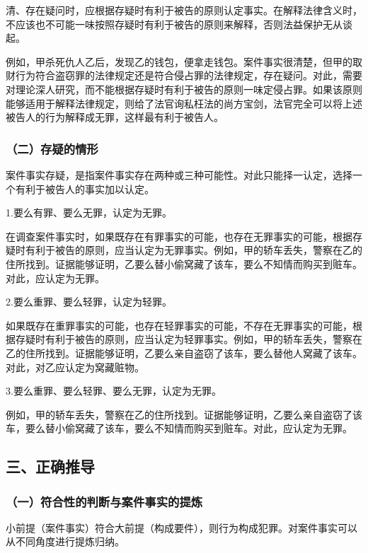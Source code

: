 清、存在疑问时，应根据存疑时有利于被告的原则认定事实。在解释法律含义时，不应该也不可能一味按照存疑时有利于被告的原则来解释，否则法益保护无从谈起。

例如，甲杀死仇人乙后，发现乙的钱包，便拿走钱包。案件事实很清楚，但甲的取财行为符合盗窃罪的法律规定还是符合侵占罪的法律规定，存在疑问。对此，需要对理论深人研究，而不能根据存疑时有利于被告的原则一味定侵占罪。如果该原则能够适用于解释法律规定，则给了法官询私枉法的尚方宝剑，法官完全可以将上述被告人的行为解释成无罪，这样最有利于被告人。

\subsubsection*{（二）存疑的情形}

案件事实存疑，是指案件事实存在两种或三种可能性。对此只能择一认定，选择一个有利于被告人的事实加以认定。

1.要么有罪、要么无罪，认定为无罪。

在调查案件事实时，如果既存在有罪事实的可能，也存在无罪事实的可能，根据存疑时有利于被告的原则，应当认定为无罪事实。例如，甲的轿车丢失，警察在乙的住所找到。证据能够证明，乙要么替小偷窝藏了该车，要么不知情而购买到赃车。对此，应认定为无罪。

2.要么重罪、要么轻罪，认定为轻罪。

如果既存在重罪事实的可能，也存在轻罪事实的可能，不存在无罪事实的可能，根据存疑时有利于被告的原则，应当认定为轻罪事实。例如，甲的轿车丢失，警察在乙的住所找到。证据能够证明，乙要么亲自盗窃了该车，要么替他人窝藏了该车。对此，对乙应认定为窝藏赃物。

3.要么重罪、要么轻罪、要么无罪，认定为无罪。

例如，甲的轿车丢失，警察在乙的住所找到。证据能够证明，乙要么亲自盗窃了该车，要么替小偷窝藏了该车，要么不知情而购买到赃车。对此，应认定为无罪。

\subsection*{三、正确推导}

\subsubsection*{（一）符合性的判断与案件事实的提炼}

小前提（案件事实）符合大前提（构成要件），则行为构成犯罪。对案件事实可以从不同角度进行提炼归纳。

